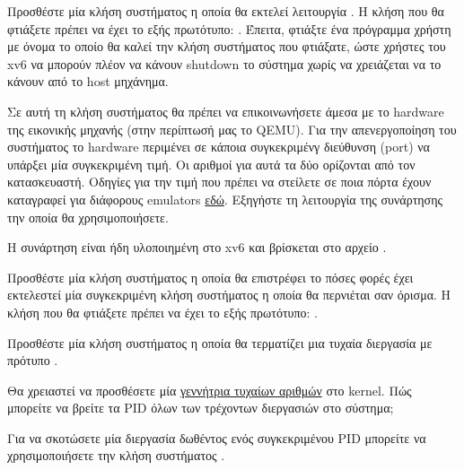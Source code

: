 \documentclass[18pt]{extarticle}
\begin{document}
\begin{question}
    Προσθέστε μία κλήση συστήματος η οποία θα εκτελεί λειτουργία . 
    Η κλήση που θα φτιάξετε πρέπει να έχει το εξής πρωτότυπο: .
    Έπειτα, φτιάξτε ένα πρόγραμμα χρήστη με όνομα  το οποίο θα καλεί την κλήση συστήματος που φτιάξατε, ώστε 
    χρήστες του xv6 να μπορούν πλέον να κάνουν shutdown το σύστημα χωρίς να χρειάζεται να το κάνουν από το host μηχάνημα.

    Σε αυτή τη κλήση συστήματος θα πρέπει να επικοινωνήσετε άμεσα με το hardware της εικονικής μηχανής (στην περίπτωσή μας το QEMU).
    Για την απενεργοποίηση του συστήματος το hardware περιμένει σε κάποια συγκεκριμένγ διεύθυνση (port) να υπάρξει μία συγκεκριμένη 
    τιμή. Οι αριθμοί για αυτά τα δύο ορίζονται από τον κατασκευαστή.
    Οδηγίες για την τιμή που πρέπει να στείλετε σε ποια πόρτα έχουν καταγραφεί για διάφορους emulators \href{https://wiki.osdev.org/Shutdown}{εδώ}.
    Εξηγήστε τη λειτουργία της συνάρτησης  την οποία θα χρησιμοποιήσετε.

    \begin{info}[Σημείωση:]
        Η συνάρτηση  είναι ήδη υλοποιημένη στο xv6 και βρίσκεται στο αρχείο .
    \end{info}
\end{question}

\begin{question}
    Προσθέστε μία κλήση συστήματος η οποία θα επιστρέφει το πόσες φορές έχει εκτελεστεί μία 
    συγκεκριμένη κλήση συστήματος η οποία θα περνιέται σαν όρισμα.
    Η κλήση που θα φτιάξετε πρέπει να έχει το εξής πρωτότυπο: .
\end{question}

\begin{question}
    Προσθέστε μία κλήση συστήματος η οποία θα τερματίζει μια τυχαία διεργασία με πρότυπο .

    Θα χρειαστεί να προσθέσετε μία \href{https://wiki.osdev.org/Random_Number_Generator#Pseudorandom_number_generators}{γεννήτρια τυχαίων αριθμών} στο kernel.
    Πώς μπορείτε να βρείτε τα PID όλων των τρέχοντων διεργασιών στο σύστημα;

    \begin{info}[Σημείωση:]
        Για να σκοτώσετε μία διεργασία δωθέντος ενός συγκεκριμένου PID
        μπορείτε να χρησιμοποιήσετε την κλήση συστήματος .
    \end{info}
\end{question}


\printbibliography
\end{document}
